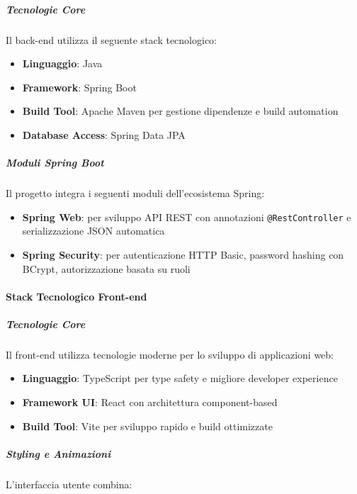 \subparagraph{Tecnologie Core}

Il back-end utilizza il seguente stack tecnologico:

\begin{itemize}[leftmargin=1.1em]
\item \textbf{Linguaggio}: Java
\item \textbf{Framework}: Spring Boot
\item \textbf{Build Tool}: Apache Maven per gestione dipendenze e build automation
\item \textbf{Database Access}: Spring Data JPA
\end{itemize}

\subparagraph{Moduli Spring Boot}

Il progetto integra i seguenti moduli dell'ecosistema Spring:

\begin{itemize}[leftmargin=1.1em]
\item \textbf{Spring Web}: per sviluppo API REST con annotazioni \texttt{@RestController} e serializzazione JSON automatica
\item \textbf{Spring Security}: per autenticazione HTTP Basic, password hashing con BCrypt, autorizzazione basata su ruoli
\end{itemize}

\paragraph{Stack Tecnologico Front-end}
\label{subsubsec:stack-frontend}

\subparagraph{Tecnologie Core}

Il front-end utilizza tecnologie moderne per lo sviluppo di applicazioni web:

\begin{itemize}[leftmargin=1.1em]
\item \textbf{Linguaggio}: TypeScript per type safety e migliore developer experience
\item \textbf{Framework UI}: React con architettura component-based
\item \textbf{Build Tool}: Vite per sviluppo rapido e build ottimizzate
\end{itemize}

\subparagraph{Styling e Animazioni}

L'interfaccia utente combina:


